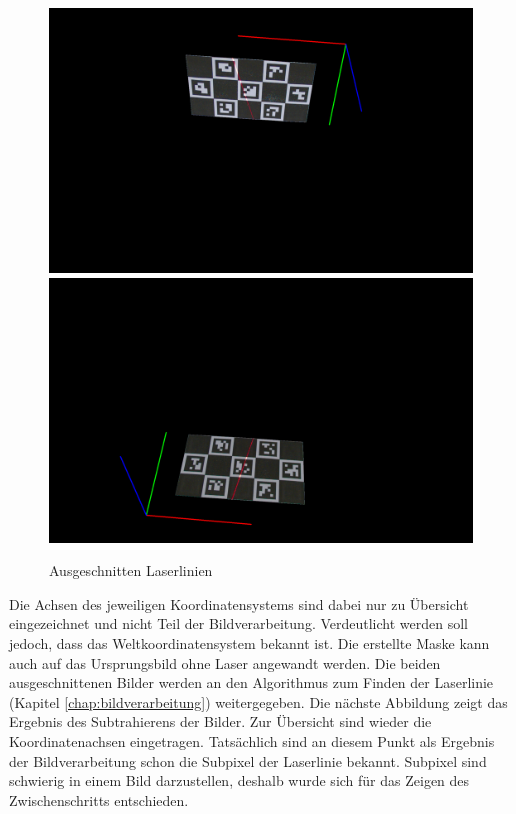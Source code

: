 		\begin{figure}[h]
			\centering
			\includegraphics[width=0.49\linewidth]{img/hauptteil/ext-calib/charuco_cut_primary.png}
			\includegraphics[width=0.49\linewidth]{img/hauptteil/ext-calib/charuco_cut_secondary.png}
			\caption{Ausgeschnitten Laserlinien}
			\label{fig:ext-calib-cut}
		\end{figure}
	
		Die Achsen des jeweiligen Koordinatensystems sind dabei nur zu Übersicht eingezeichnet und nicht Teil der Bildverarbeitung. Verdeutlicht werden soll jedoch, dass das Weltkoordinatensystem bekannt ist. \newline
		Die erstellte Maske kann auch auf das Ursprungsbild ohne Laser angewandt werden. Die beiden ausgeschnittenen Bilder werden an den Algorithmus zum Finden der Laserlinie (Kapitel \ref{chap:bildverarbeitung}) weitergegeben. Die nächste Abbildung zeigt das Ergebnis des Subtrahierens der Bilder. Zur Übersicht sind wieder die Koordinatenachsen eingetragen. Tatsächlich sind an diesem Punkt als Ergebnis der Bildverarbeitung schon die Subpixel der Laserlinie bekannt. Subpixel sind schwierig in einem Bild darzustellen, deshalb wurde sich für das Zeigen des Zwischenschritts entschieden.
	
